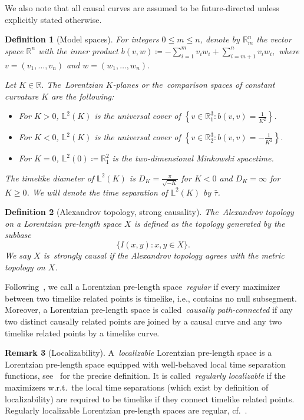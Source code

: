 \documentclass[a4paper,11pt]{article}
\numberwithin{equation}{section}
\theoremstyle{plain}
\newtheorem{Definition}{Definition}[section]
\theoremstyle{definition}
\newtheorem{Remark}[Definition]{Remark}
\newcommand{\lm}[1]{\mathbb{L}^2(#1)}
\begin{document}
We also note that all causal curves are assumed to be future-directed unless explicitly stated otherwise.

\begin{Definition}[Model spaces]
\label{Def: model spaces}
For integers $0 \le m \le n$, denote by $\mathbb{R}_{m}^{n}$ the vector space $\mathbb{R}^{n}$ with the inner product $b(v,w) \coloneqq -\sum_{i=1}^{m}v_{i}w_{i} + \sum_{i=m+1}^{n}v_{i}w_{i},$ where $v=(v_1, \dots, v_n)$ and $w=(w_1, \dots ,w_n)$.\par
Let $K \in \mathbb{R}$. The~\emph{Lorentzian $K$-planes\/} or the~\emph{comparison spaces of constant curvature $K$\/} are the following:
\begin{itemize}
    \item For $K>0$, $\mathbb{L}^{2}(K)$ is the universal cover of $\left\{ v \in \mathbb{R}_{1}^{3} : b(v,v) = \frac{1}{K^{2}} \right\}$.
    \item For $K<0$, $\mathbb{L}^{2}(K)$ is the universal cover of $\left\{v \in \mathbb{R}_{2}^{3} : b(v,v) = -\frac{1}{K^{2}} \right\}$.
    \item For $K=0$, $\mathbb{L}^{2}(0) \coloneqq \mathbb{R}_{1}^{2}$ is the two-dimensional Minkowski spacetime.
\end{itemize}
The timelike diameter of $\lm{K}$ is $D_K = \frac{\pi}{\sqrt{-K}}$ for $K < 0$ and
$D_K = \infty$ for $K \ge 0$. We will denote the time separation of $\mathbb{L}^2(K)$ by $\bar{\tau}$.
\end{Definition}

\begin{Definition}[Alexandrov topology, strong causality]
The~\emph{Alexandrov topology\/} on a Lorentzian pre-length space $X$ is defined as the topology generated by the subbase
\begin{equation}
    \{I(x,y) : x,y \in X\}.
\end{equation}
We say $X$ is~\emph{strongly causal\/} if the Alexandrov topology agrees with the metric topology on $X$.
\end{Definition}

Following~\cite{BKR24}, we call a Lorentzian pre-length space~\emph{regular\/} if every maximizer between two timelike related points is timelike, i.e., contains no null subsegment. Moreover, a Lorentzian pre-length space is called~\emph{causally path-connected\/} if any two distinct causally related points are joined by a causal curve and any two timelike related points by a timelike curve.

\begin{Remark}[Localizability]
A~\emph{localizable\/} Lorentzian pre-length space is a Lorentzian pre-length space equipped with well-behaved local time separation functions, see~\cite[Def.\ 3.16]{kunzinger2018lorentzian} for the precise definition. It is called~\emph{regularly localizable\/} if the maximizers w.r.t.\ the local time separations (which exist by definition of localizability) are required to be  
timelike if they connect timelike related points. Regularly localizable Lorentzian pre-length spaces are regular, cf.\ \cite[Thm.\ 3.18]{kunzinger2018lorentzian}.
\end{Remark}
\end{document}
